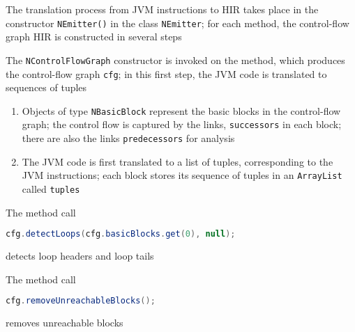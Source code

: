 \documentclass[8pt,a4paper,compress]{beamer}
\begin{document}
\begin{frame}[fragile]
\pause

The translation process from JVM instructions to HIR takes place in the constructor \lstinline{NEmitter()} in the class \lstinline{NEmitter}; for each method, the control-flow graph HIR is constructed in several steps

\pause
\bigskip

The \lstinline{NControlFlowGraph} constructor is invoked on the method, which produces the control-flow graph \lstinline{cfg}; in this first step, the JVM code is translated to sequences of tuples

\begin{enumerate}
\item Objects of type \lstinline{NBasicBlock} represent the basic blocks in the control-flow graph; the control flow is captured by the links, \lstinline{successors} in each block; there are also the links \lstinline{predecessors} for analysis

\item The JVM code is first translated to a list of tuples, corresponding to the JVM instructions; each block stores its sequence of tuples in an \lstinline{ArrayList} called \lstinline{tuples}
\end{enumerate}

\pause
\bigskip

The method call
\begin{lstlisting}[language=Java,style=focusin]
cfg.detectLoops(cfg.basicBlocks.get(0), null);
\end{lstlisting}
detects loop headers and loop tails

\pause
\bigskip

The method call
\begin{lstlisting}[language=Java,style=focusin]
cfg.removeUnreachableBlocks();
\end{lstlisting}
removes unreachable blocks
\end{frame}
\end{document}
